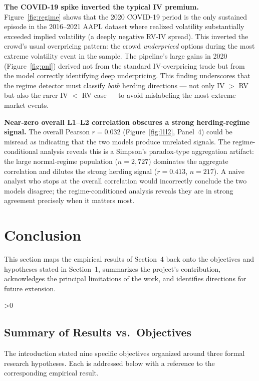 \documentclass[12pt, letterpaper]{article}
\let\oldsection\section
\renewcommand{\section}{\clearpage\oldsection}
\let\oldsubsection\subsection
\renewcommand{\subsection}{%
  \ifnum\value{subsection}>0 \clearpage\fi
  \oldsubsection
}
\begin{document}
\textbf{The COVID-19 spike inverted the typical IV premium.}
Figure~\ref{fig:regime} shows that the 2020 COVID-19 period is the
only sustained episode in the 2016--2021 AAPL dataset where
realized volatility substantially exceeded implied volatility (a
deeply negative RV-IV spread). This inverted the crowd's usual
overpricing pattern: the crowd \textit{underpriced} options during
the most extreme volatility event in the sample. The pipeline's
large gains in 2020 (Figure~\ref{fig:pnl}) derived not from the
standard IV-overpricing trade but from the model correctly
identifying deep underpricing. This finding underscores that the
regime detector must classify \textit{both} herding directions ---
not only IV $>$ RV but also the rarer IV $<$ RV case --- to avoid
mislabeling the most extreme market events.

\textbf{Near-zero overall L1--L2 correlation obscures a strong
herding-regime signal.} The overall Pearson $r = 0.032$
(Figure~\ref{fig:l1l2}, Panel~4) could be misread as indicating
that the two models produce unrelated signals. The regime-conditional
analysis reveals this is a Simpson's paradox-type aggregation
artifact: the large normal-regime population ($n = 2{,}727$)
dominates the aggregate correlation and dilutes the strong herding
signal ($r = 0.413$, $n = 217$). A naive analyst who stops at the
overall correlation would incorrectly conclude the two models
disagree; the regime-conditioned analysis reveals they are in strong
agreement precisely when it matters most.

\section{Conclusion}

This section maps the empirical results of Section~4 back onto the
objectives and hypotheses stated in Section~1, summarizes the
project's contribution, acknowledges the principal limitations of the
work, and identifies directions for future extension.

\subsection{Summary of Results vs.\ Objectives}

The introduction stated nine specific objectives organized around
three formal research hypotheses. Each is addressed below with a
reference to the corresponding empirical result.
\end{document}
